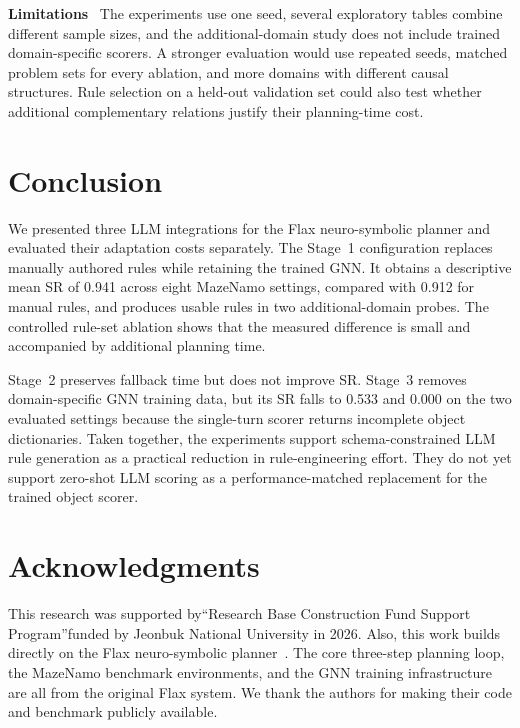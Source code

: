 \documentclass{ieeeaccess}
\newcommand{\myparagraph}[1]{\noindent\textbf{#1}~}
\begin{document}
\myparagraph{Limitations}
The experiments use one seed, several exploratory tables combine different sample sizes, and the additional-domain study does not include trained domain-specific scorers. A stronger evaluation would use repeated seeds, matched problem sets for every ablation, and more domains with different causal structures. Rule selection on a held-out validation set could also test whether additional complementary relations justify their planning-time cost.


\section{Conclusion}
\label{sec:conclusion}

We presented three LLM integrations for the Flax neuro-symbolic planner and evaluated their adaptation costs separately.
The Stage~1 configuration replaces manually authored rules while retaining the trained GNN. It obtains a descriptive mean SR of 0.941 across eight MazeNamo settings, compared with 0.912 for manual rules, and produces usable rules in two additional-domain probes. The controlled rule-set ablation shows that the measured difference is small and accompanied by additional planning time.

Stage~2 preserves fallback time but does not improve SR. Stage~3 removes domain-specific GNN training data, but its SR falls to 0.533 and 0.000 on the two evaluated settings because the single-turn scorer returns incomplete object dictionaries.
Taken together, the experiments support schema-constrained LLM rule generation as a practical reduction in rule-engineering effort. They do not yet support zero-shot LLM scoring as a performance-matched replacement for the trained object scorer.


\section*{Acknowledgments}
This research was supported by“Research Base Construction Fund Support Program”funded by Jeonbuk National University in 2026.
Also, this work builds directly on the Flax neuro-symbolic planner~\cite{du2026fast}.
The core three-step planning loop, the MazeNamo benchmark environments, and the GNN training infrastructure are all from the original Flax system.
We thank the authors for making their code and benchmark publicly available.




\EOD
\end{document}
